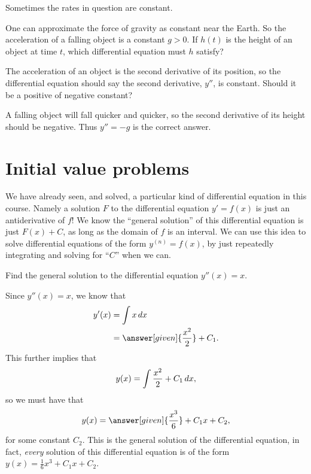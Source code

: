 \documentclass{ximera}
\begin{document}
Sometimes the rates in question are constant. 



\begin{question}
  One can approximate the force of gravity as constant near the Earth.
  So the acceleration of a falling object is a constant $g>0$.  If
  $h(t)$ is the height of an object at time $t$, which differential
  equation must $h$ satisfy?
  \begin{multipleChoice}
  \end{multipleChoice}
  
  \begin{hint}
    The acceleration of an object is the second derivative of its
    position, so the differential equation should say the second
    derivative, $y''$, is constant.  Should it be a positive of
    negative constant?
  \end{hint}
  \begin{hint}
    A falling object will fall quicker and quicker, so the second
    derivative of its height should be negative.  Thus $y''=-g$ is the
    correct answer.
  \end{hint}	
\end{question}

\section{Initial value problems}


We have already seen, and solved, a particular kind of differential
equation in this course.  Namely a solution $F$ to the differential
equation $y' = f(x)$ is just an antiderivative of $f$!  We know the
``general solution'' of this differential equation is just $F(x)+C$,
as long as the domain of $f$ is an interval.  We can use this idea to
solve differential equations of the form $y^{(n)} = f(x)$, by just
repeatedly integrating and solving for ``$C$'' when we can.

\begin{example}
  Find the general solution to the differential equation $y''(x) = x$.
  \begin{explanation}
    Since $y''(x) = x$, we know that
    \begin{align*}
      y'(x) &= \int x \d x\\
      &= \answer[given]{\frac{x^2}{2}} + C_1.
    \end{align*}
    This further implies that
    \[
    y(x) = \int \frac{x^2}{2} + C_1 \mathop{}\!d x,
    \]
    so we must have that
    \[
    y(x) = \answer[given]{\frac{x^3}{6}}+C_1x+C_2,
    \]
    for some constant $C_2$.  This is the general solution of the
    differential equation, in fact, \textit{every} solution of this
    differential equation is of the form $y(x) =
    \frac{1}{6}x^3+C_1x+C_2$.
  \end{explanation}
\end{example}
\end{document}
